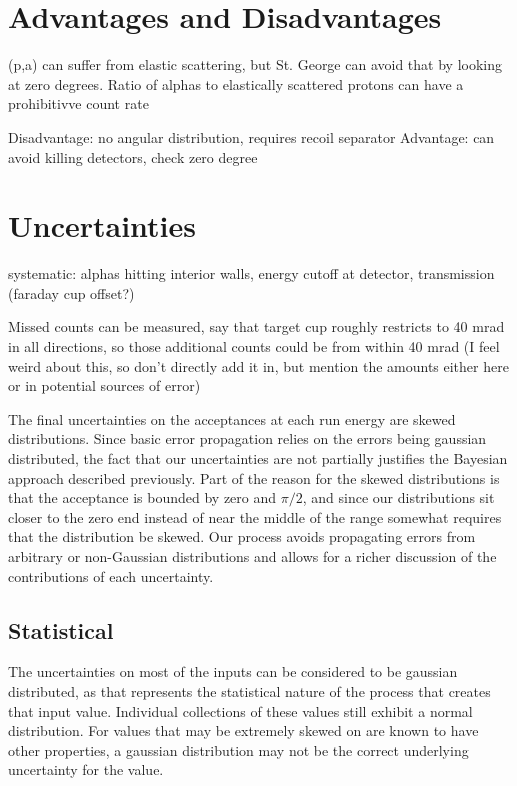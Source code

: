 \section{Advantages and Disadvantages}
(p,a) can suffer from elastic scattering, but St. George can avoid that
by looking at zero degrees. Ratio of alphas to elastically scattered
protons can have a prohibitivve count rate

Disadvantage: no angular distribution, requires recoil separator
Advantage: can avoid killing detectors, check zero degree


\section{Uncertainties}
\label{sec:uncertainties}


systematic: alphas hitting interior walls, energy cutoff at detector,
transmission (faraday cup offset?)

Missed counts can be measured, say that target cup roughly restricts to
40 mrad in all directions, so those additional counts could be from
within 40 mrad (I feel weird about this, so don't directly add it in,
but mention the amounts either here or in potential sources of error)


The final uncertainties on the acceptances at each run energy are skewed
distributions. Since basic error propagation relies on the errors being
gaussian distributed, the fact that our uncertainties are not partially
justifies the Bayesian approach described previously. Part of the reason
for the skewed distributions is that the acceptance is bounded by zero
and $\pi/2$, and since our distributions sit closer to the zero end
instead of near the middle of the range somewhat requires that the
distribution be skewed. Our process avoids propagating errors from
arbitrary or non-Gaussian distributions and allows for a richer
discussion of the contributions of each uncertainty.

\subsection{Statistical}

The uncertainties on most of the inputs can be considered to be gaussian distributed, as
that represents the statistical nature of the process that creates that
input value. Individual collections of these values still exhibit a
normal distribution. For values that may be extremely skewed on are
known to have other properties, a gaussian distribution may not be the
correct underlying uncertainty for the value.

